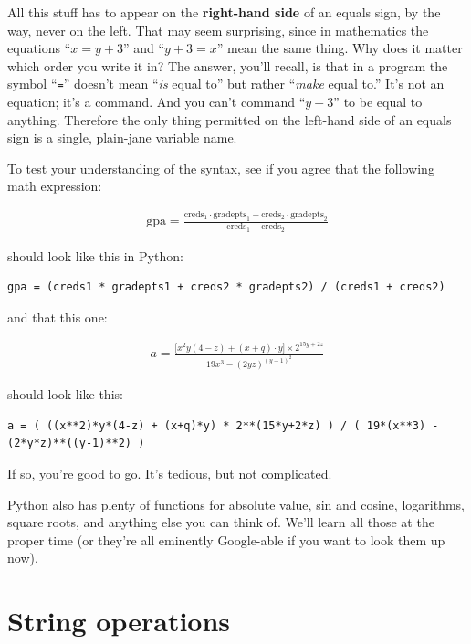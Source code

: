 All this stuff has to appear on the \textbf{right-hand side} of an equals sign,
by the way, never on the left. That may seem surprising, since in mathematics
the equations ``$x = y + 3$'' and ``$y + 3 = x$'' mean the same thing. Why does
it matter which order you write it in? The answer, you'll recall, is that in a
program the symbol ``\texttt{=}'' doesn't mean ``\textit{is} equal to'' but
rather ``\textit{make} equal to.'' It's not an equation; it's a command. And
you can't command ``$y+3$'' to be equal to anything. Therefore the only thing
permitted on the left-hand side of an equals sign is a single, plain-jane
variable name.

To test your understanding of the syntax, see if you agree that the following
math expression:

\begin{align*}
\textrm{gpa} = \frac{
\textrm{creds}_1 \cdot \textrm{gradepts}_1 +
\textrm{creds}_2 \cdot \textrm{gradepts}_2}
{\textrm{creds}_1 + \textrm{creds}_2}
\end{align*}

should look like this in Python:

\begin{Verbatim}[fontsize=\small,samepage=true,frame=single,framesep=3mm]
gpa = (creds1 * gradepts1 + creds2 * gradepts2) / (creds1 + creds2)
\end{Verbatim}

and that this one:

\begin{align*}
a = \frac{\lbrack x^2y(4-z) + (x+q)\cdot y \rbrack \times 2^{15y+2z}}
{19x^3 - (2yz)^{(y-1)^2}}
\end{align*}

should look like this:

\begin{Verbatim}[fontsize=\scriptsize,samepage=true,frame=single,framesep=3mm]
a = ( ((x**2)*y*(4-z) + (x+q)*y) * 2**(15*y+2*z) ) / ( 19*(x**3) - (2*y*z)**((y-1)**2) )
\end{Verbatim}

If so, you're good to go. It's tedious, but not complicated.

Python also has plenty of functions for absolute value, sin and cosine,
logarithms, square roots, and anything else you can think of. We'll learn all
those at the proper time (or they're all eminently Google-able if you want to
look them up now).


\section{String operations}

